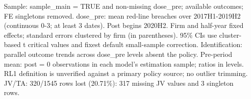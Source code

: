 \begin{table}
\caption{Pooled difference-in-differences estimates: pre-policy dose $\times$ post}
\label{tab:did_main}
\centering
{}

\par\smallskip
\begin{minipage}{\linewidth}\footnotesize
Sample: sample\_main = TRUE and non-missing dose\_pre; available outcomes; FE singletons removed. dose\_pre: mean red-line breaches over 2017H1-2019H2 (continuous 0-3; at least 3 dates). Post begins 2020H2. Firm and half-year fixed effects; standard errors clustered by firm (in parentheses). 95\% CIs use cluster-based t critical values and fixest default small-sample correction. Identification: parallel outcome trends across dose\_pre levels absent the policy. Pre-period mean: post = 0 observations in each model's estimation sample; ratios in levels. RL1 definition is unverified against a primary policy source; no outlier trimming. JV/TA: 320/1545 rows lost (20.71\%): 317 missing JV values and 3 singleton rows.
\end{minipage}
\end{table}
